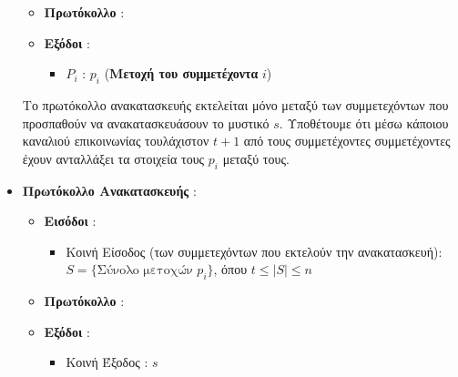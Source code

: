 \begin{definition}
\begin{itemize}
\begin{itemize}
        \item \textbf{Πρωτόκολλο} : \\
        \item \textbf{Εξόδοι} : \\
            \begin{itemize}
                \item $P_i$ : $p_i$ (\textbf{Μετοχή του συμμετέχοντα } $i$)
            \end{itemize}
    \end{itemize}
    Το πρωτόκολλο ανακατασκευής εκτελείται μόνο μεταξύ των συμμετεχόντων που προσπαθούν να ανακατασκευάσουν το μυστικό $s$. Υποθέτουμε ότι μέσω κάποιου καναλιού επικοινωνίας τουλάχιστον $t+1$ από τους συμμετέχοντες συμμετέχοντες έχουν ανταλλάξει τα στοιχεία τους $p_i$ μεταξύ τους.
    \item \textbf{Πρωτόκολλο Ανακατασκευής} :
    \begin{itemize}
        \item \textbf{Εισόδοι} :
            \begin{itemize}
                \item Κοινή Είσοδος (των συμμετεχόντων που εκτελούν την ανακατασκευή): $S = \{\text{Σύνολο μετοχών } p_i \}$, όπου $t \le |S| \le n$
            \end{itemize}
        \item \textbf{Πρωτόκολλο} : \\
        \item \textbf{Εξόδοι} :
            \begin{itemize}
                \item Κοινή Έξοδος : $s$
            \end{itemize}
    \end{itemize}
\end{itemize}

\end{definition}

